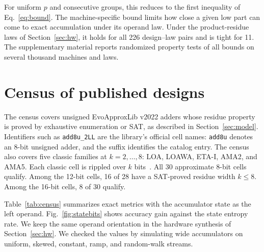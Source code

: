 \documentclass[preprint,12pt,numbers]{elsarticle}
\theoremstyle{definition}
\begin{document}
For uniform $p$ and consecutive groups, this reduces to the first
inequality of Eq.~\eqref{eq:bound}. The machine-specific bound limits
how close a given low part can come to exact accumulation under its
operand law. Under the product-residue laws of Section~\ref{sec:hw}, it holds
for all 226 design--law pairs and is tight for 11. The supplementary
material reports randomized property tests of all bounds on several
thousand machines and laws.

\section{Census of published designs}
\label{sec:census}

The census covers unsigned EvoApproxLib v2022 adders whose residue
property is proved by exhaustive enumeration or SAT, as described in
Section~\ref{sec:model}. Identifiers such as \texttt{add8u\_2LL} are the
library's official cell names: \texttt{add8u} denotes an 8-bit unsigned
adder, and the suffix identifies the catalog entry. The census also
covers five classic families at
$k=2,\ldots,8$: LOA, LOAWA, ETA-I, AMA2, and AMA5. Each classic cell is
rippled over $k$ bits~\cite{gupta2013ama}. All 30 approximate 8-bit
cells qualify. Among the 12-bit cells, 16 of 28 have a SAT-proved
residue width $k\le8$. Among the 16-bit cells, 8 of 30 qualify.

Table~\ref{tab:census} summarizes exact metrics with the accumulator
state as the left operand. Fig.~\ref{fig:statebits} shows accuracy gain
against the state entropy rate. We keep the same operand orientation
in the hardware synthesis of Section~\ref{sec:hw}. We checked the
values by simulating wide accumulators on uniform, skewed, constant,
ramp, and random-walk streams.
\end{document}
